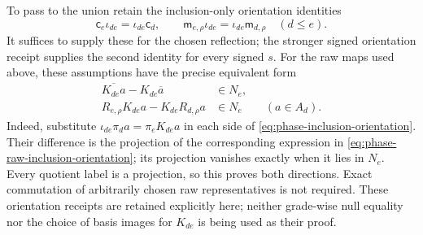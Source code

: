 To pass to the union retain the inclusion-only orientation identities
\begin{equation}\label{eq:phase-inclusion-orientation}
 \mathsf c_e\iota_{de}=\iota_{de}\mathsf c_d,
 \qquad
 \mathsf m_{e,\rho}\iota_{de}=\iota_{de}\mathsf m_{d,\rho}
 \quad(d\le e).
\end{equation}
It suffices to supply these for the chosen reflection; the stronger signed
orientation receipt supplies the second identity for every signed $s$.
For the raw maps used above, these assumptions have the precise equivalent
form
\begin{equation}\label{eq:phase-raw-inclusion-orientation}
 \begin{split}
 \overline{K_{de}a}-K_{de}\overline a&\in N_e,\\
 R_{e,\rho}K_{de}a-K_{de}R_{d,\rho}a&\in N_e
 \qquad(a\in A_d).
 \end{split}
\end{equation}
Indeed, substitute $\iota_{de}\pi_da=\pi_eK_{de}a$ in each side of
\eqref{eq:phase-inclusion-orientation}. Their difference is the projection
of the corresponding expression in
\eqref{eq:phase-raw-inclusion-orientation}; its projection vanishes exactly
when it lies in $N_e$. Every quotient label is a projection, so this proves
both directions. Exact commutation of arbitrarily chosen raw representatives
is not required. These orientation receipts are retained explicitly here;
neither grade-wise null equality nor the choice of basis images for $K_{de}$
is being used as their proof.


